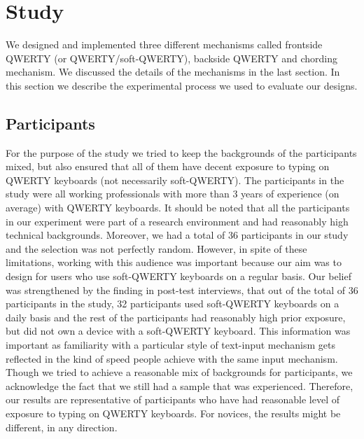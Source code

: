\section{Study}

We designed and implemented three different mechanisms called
frontside QWERTY (or QWERTY/soft-QWERTY), backside QWERTY and chording
mechanism. We discussed the details of the mechanisms in the last
section. In this section we describe the experimental process we used
to evaluate our designs.

\subsection{Participants}


For the purpose of the study we tried to keep the backgrounds of the
participants mixed, but also ensured that all of them have decent
exposure to typing on QWERTY keyboards (not necessarily
soft-QWERTY). The participants in the study were all working
professionals with more than 3 years of experience (on average) with
QWERTY keyboards. It should be noted that all the participants in our
experiment were part of a research environment and had reasonably high
technical backgrounds. Moreover, we had a total of 36 participants in
our study and the selection was not perfectly random. However, in
spite of these limitations, working with this audience was important
because our aim was to design for users who use soft-QWERTY keyboards
on a regular basis. Our belief was strengthened by the finding in
post-test interviews, that out of the total of 36 participants in the
study, 32 participants used soft-QWERTY keyboards on a daily basis and
the rest of the participants had reasonably high prior exposure, but
did not own a device with a soft-QWERTY keyboard. This information was
important as familiarity with a particular style of text-input
mechanism gets reflected in the kind of speed people achieve with the
same input mechanism. Though we tried to achieve a reasonable mix of
backgrounds for participants, we acknowledge the fact that we still
had a sample that was experienced. Therefore, our results are
representative of participants who have had reasonable level of
exposure to typing on QWERTY keyboards. For novices, the results might
be different, in any direction.

